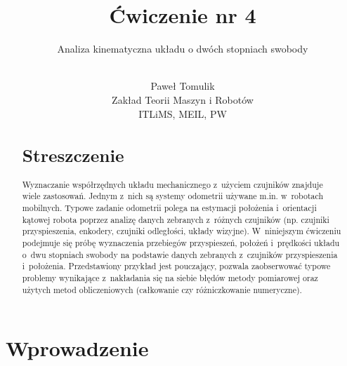 \documentclass[paper=a4,DIV=12]{lpas}
\begin{document}

\title{\Large{Ćwiczenie nr 4}}

\subtitle{\huge{Analiza kinematyczna układu o dwóch stopniach swobody}}

\author{\\Paweł Tomulik\\ Zakład Teorii Maszyn i Robotów\\ ITLiMS, MEIL, PW}
\date{}
\maketitle
\thispagestyle{empty}

\pagebreak
\tableofcontents
\pagebreak

\begin{abstract}
\section{Streszczenie}
\noindent Wyznaczanie współrzędnych układu mechanicznego z~użyciem czujników znajduje
  wiele zastosowań. Jednym z~nich są systemy odometrii używane m.in. w~robotach
  mobilnych. Typowe zadanie odometrii polega na estymacji położenia
  i~orientacji kątowej robota poprzez analizę danych zebranych z~różnych
  czujników (np. czujniki przyspieszenia, enkodery, czujniki odległości, układy
  wizyjne). W~niniejszym ćwiczeniu podejmuje się próbę wyznaczenia przebiegów
  przyspieszeń, położeń i~prędkości układu o~dwu stopniach swobody na podstawie
  danych zebranych z~czujników przyspieszenia i~położenia. Przedstawiony
  przykład jest pouczający, pozwala zaobserwować typowe problemy wynikające
  z~nakładania się na siebie błędów metody pomiarowej oraz użytych metod
  obliczeniowych (całkowanie czy różniczkowanie numeryczne).
\end{abstract}

\section{Wprowadzenie}
\label{sec:BP9CM}
\end{document}
